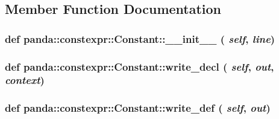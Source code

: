 \subsection{Member Function Documentation}
\hypertarget{classpanda_1_1constexpr_1_1Constant_a8a0fd30cc60b1b7c7a361431c6886971}{
\subsubsection[{\_\-\_\-init\_\-\_\-}]{\setlength{\rightskip}{0pt plus 5cm}def panda::constexpr::Constant::\_\-\_\-init\_\-\_\- ( {\em self}, \/   {\em line})}}
\label{classpanda_1_1constexpr_1_1Constant_a8a0fd30cc60b1b7c7a361431c6886971}
\hypertarget{classpanda_1_1constexpr_1_1Constant_a14c963cd2fd6ce0149d3072a9e28d4a0}{
\subsubsection[{write\_\-decl}]{\setlength{\rightskip}{0pt plus 5cm}def panda::constexpr::Constant::write\_\-decl ( {\em self}, \/   {\em out}, \/   {\em context})}}
\label{classpanda_1_1constexpr_1_1Constant_a14c963cd2fd6ce0149d3072a9e28d4a0}
\hypertarget{classpanda_1_1constexpr_1_1Constant_ac3ab9be69e5deb637e561c564b65fdba}{
\subsubsection[{write\_\-def}]{\setlength{\rightskip}{0pt plus 5cm}def panda::constexpr::Constant::write\_\-def ( {\em self}, \/   {\em out})}}
\label{classpanda_1_1constexpr_1_1Constant_ac3ab9be69e5deb637e561c564b65fdba}


